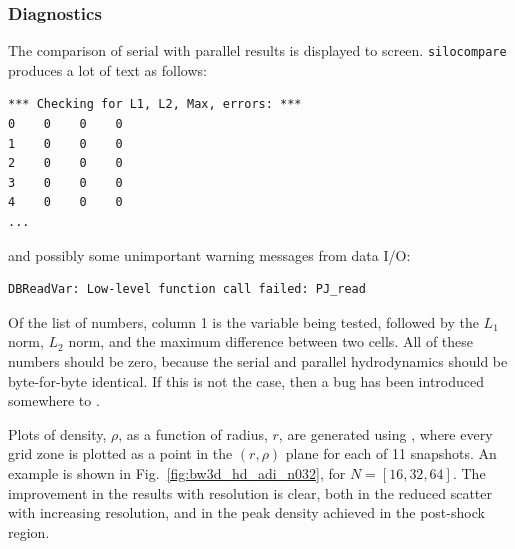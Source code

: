 \documentclass[a4paper,11pt]{report}
\begin{document}
\subsubsection{Diagnostics}

The comparison of serial with parallel results is displayed to screen.
\lstinline|silocompare| produces a lot of text as follows:
\begin{verbatim}
*** Checking for L1, L2, Max, errors: ***
0    0    0    0
1    0    0    0
2    0    0    0
3    0    0    0
4    0    0    0
...
\end{verbatim}
and possibly some unimportant warning messages from data I/O:
\begin{verbatim}
DBReadVar: Low-level function call failed: PJ_read
\end{verbatim}
Of the list of numbers, column 1 is the variable being tested, followed by the $L_1$ norm, $L_2$ norm, and the maximum difference between two cells.
All of these numbers should be zero, because the serial and parallel hydrodynamics should be byte-for-byte identical.
If this is not the case, then a bug has been introduced somewhere to \pion{}.

Plots of density, $\rho$, as a function of radius, $r$, are generated using \visit{}, where every grid zone is plotted as a point in the $(r,\rho)$ plane for each of 11 snapshots.
An example is shown in Fig.~\ref{fig:bw3d_hd_adi_n032}, for $N=[16,32,64]$.
The improvement in the results with resolution is clear, both in the reduced scatter with increasing resolution, and in the peak density achieved in the post-shock region.
\end{document}
